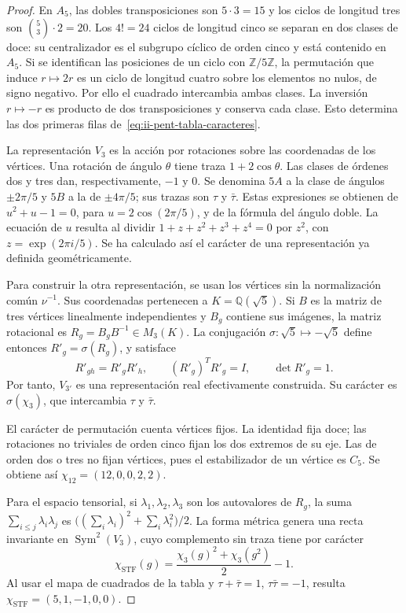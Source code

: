 \begin{proof}
En \(A_5\), las dobles transposiciones son \(5\cdot3=15\) y
los ciclos de longitud tres son \(\binom53\cdot2=20\).
Los \(4!=24\) ciclos de longitud cinco se separan en dos clases de
doce: su centralizador es el subgrupo cíclico de orden cinco y está
contenido en \(A_5\). Si se identifican las posiciones de un ciclo
con \(\mathbb Z/5\mathbb Z\), la permutación que induce
\(r\mapsto2r\) es un ciclo de longitud cuatro sobre los elementos
no nulos, de signo negativo. Por ello el cuadrado intercambia ambas
clases. La inversión \(r\mapsto-r\) es producto de dos
transposiciones y conserva cada clase. Esto determina las dos primeras
filas de~\eqref{eq:ii-pent-tabla-caracteres}.

La representación \(V_3\) es la acción por rotaciones sobre las
coordenadas de los vértices. Una rotación de ángulo \(\theta\)
tiene traza \(1+2\cos\theta\). Las clases de órdenes dos y tres
dan, respectivamente, \(-1\) y \(0\). Se denomina \(5A\) a la
clase de ángulos \(\pm2\pi/5\) y \(5B\) a la de
\(\pm4\pi/5\); sus trazas son \(\tau\) y \(\bar\tau\).
Estas expresiones se obtienen de
\(u^2+u-1=0\), para \(u=2\cos(2\pi/5)\), y de la fórmula
del ángulo doble. La ecuación de \(u\) resulta al dividir
\(1+z+z^2+z^3+z^4=0\) por \(z^2\), con
\(z=\exp(2\pi i/5)\). Se ha calculado así el carácter de una
representación ya definida geométricamente.

Para construir la otra representación, se usan los vértices sin la
normalización común \(\nu^{-1}\). Sus coordenadas pertenecen a
\(K=\mathbb Q(\sqrt5)\). Si \(B\) es la matriz de tres vértices
linealmente independientes y \(B_g\) contiene sus imágenes, la
matriz rotacional es \(R_g=B_gB^{-1}\in M_3(K)\).
La conjugación \(\sigma:\sqrt5\mapsto-\sqrt5\) define entonces
\(R'_g=\sigma(R_g)\), y satisface
\[
 R'_{gh}=R'_gR'_h,\qquad
 (R'_g)^TR'_g=I,\qquad \det R'_g=1.
\]
Por tanto, \(V_{3'}\) es una representación real efectivamente
construida. Su carácter es \(\sigma(\chi_3)\), que intercambia
\(\tau\) y \(\bar\tau\).

El carácter de permutación cuenta vértices fijos. La identidad fija
doce; las rotaciones no triviales de orden cinco fijan los dos extremos
de su eje. Las de orden dos o tres no fijan vértices, pues el
estabilizador de un vértice es \(C_5\). Se obtiene así
\(\chi_{12}=(12,0,0,2,2)\).

Para el espacio tensorial, si \(\lambda_1,\lambda_2,\lambda_3\)
son los autovalores de \(R_g\), la suma
\(\sum_{i\leq j}\lambda_i\lambda_j\) es
\(\bigl((\sum_i\lambda_i)^2+\sum_i\lambda_i^2\bigr)/2\).
La forma métrica genera una recta invariante en
\(\operatorname{Sym}^2(V_3)\), cuyo complemento sin traza tiene
por carácter
\begin{equation}
\label{eq:ii-pent-caracter-stf}
 \chi_{\mathrm{STF}}(g)
 =\frac{\chi_3(g)^2+\chi_3(g^2)}2-1.
\end{equation}
Al usar el mapa de cuadrados de la tabla y
\(\tau+\bar\tau=1\), \(\tau\bar\tau=-1\), resulta
\(\chi_{\mathrm{STF}}=(5,1,-1,0,0)\).


\end{proof}
